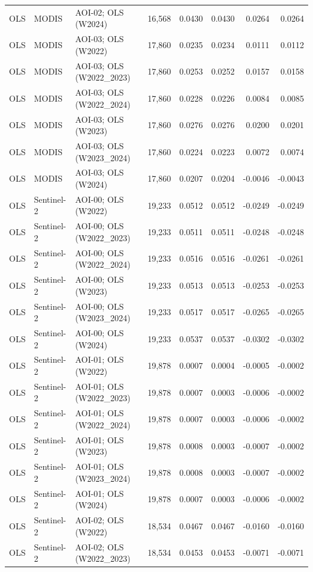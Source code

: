 \begin{landscape}
\begin{longtable}{lllrrrrr}
OLS & MODIS & AOI-02; OLS (W2024) & 16,568 & 0.0430 & 0.0430 & 0.0264 & 0.0264 \\
OLS & MODIS & AOI-03; OLS (W2022) & 17,860 & 0.0235 & 0.0234 & 0.0111 & 0.0112 \\
OLS & MODIS & AOI-03; OLS (W2022\_2023) & 17,860 & 0.0253 & 0.0252 & 0.0157 & 0.0158 \\
OLS & MODIS & AOI-03; OLS (W2022\_2024) & 17,860 & 0.0228 & 0.0226 & 0.0084 & 0.0085 \\
OLS & MODIS & AOI-03; OLS (W2023) & 17,860 & 0.0276 & 0.0276 & 0.0200 & 0.0201 \\
OLS & MODIS & AOI-03; OLS (W2023\_2024) & 17,860 & 0.0224 & 0.0223 & 0.0072 & 0.0074 \\
OLS & MODIS & AOI-03; OLS (W2024) & 17,860 & 0.0207 & 0.0204 & -0.0046 & -0.0043 \\
OLS & Sentinel-2 & AOI-00; OLS (W2022) & 19,233 & 0.0512 & 0.0512 & -0.0249 & -0.0249 \\
OLS & Sentinel-2 & AOI-00; OLS (W2022\_2023) & 19,233 & 0.0511 & 0.0511 & -0.0248 & -0.0248 \\
OLS & Sentinel-2 & AOI-00; OLS (W2022\_2024) & 19,233 & 0.0516 & 0.0516 & -0.0261 & -0.0261 \\
OLS & Sentinel-2 & AOI-00; OLS (W2023) & 19,233 & 0.0513 & 0.0513 & -0.0253 & -0.0253 \\
OLS & Sentinel-2 & AOI-00; OLS (W2023\_2024) & 19,233 & 0.0517 & 0.0517 & -0.0265 & -0.0265 \\
OLS & Sentinel-2 & AOI-00; OLS (W2024) & 19,233 & 0.0537 & 0.0537 & -0.0302 & -0.0302 \\
OLS & Sentinel-2 & AOI-01; OLS (W2022) & 19,878 & 0.0007 & 0.0004 & -0.0005 & -0.0002 \\
OLS & Sentinel-2 & AOI-01; OLS (W2022\_2023) & 19,878 & 0.0007 & 0.0003 & -0.0006 & -0.0002 \\
OLS & Sentinel-2 & AOI-01; OLS (W2022\_2024) & 19,878 & 0.0007 & 0.0003 & -0.0006 & -0.0002 \\
OLS & Sentinel-2 & AOI-01; OLS (W2023) & 19,878 & 0.0008 & 0.0003 & -0.0007 & -0.0002 \\
OLS & Sentinel-2 & AOI-01; OLS (W2023\_2024) & 19,878 & 0.0008 & 0.0003 & -0.0007 & -0.0002 \\
OLS & Sentinel-2 & AOI-01; OLS (W2024) & 19,878 & 0.0007 & 0.0003 & -0.0006 & -0.0002 \\
OLS & Sentinel-2 & AOI-02; OLS (W2022) & 18,534 & 0.0467 & 0.0467 & -0.0160 & -0.0160 \\
OLS & Sentinel-2 & AOI-02; OLS (W2022\_2023) & 18,534 & 0.0453 & 0.0453 & -0.0071 & -0.0071 \\

\end{longtable}
\end{landscape}
